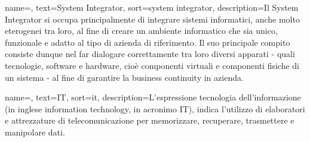 

{
    name=,
    text=System Integrator,
    sort=system integrator,
    description={Il System Integrator si occupa principalmente di integrare sistemi informatici, anche molto eterogenei tra loro, al fine di creare un ambiente informatico che sia unico, funzionale e adatto al tipo di azienda di riferimento. Il suo principale compito consiste dunque nel far dialogare correttamente tra loro diversi apparati - quali tecnologie, software e hardware, cioè componenti virtuali e componenti fisiche di un sistema - al fine di garantire la business continuity in azienda. }
}

{
    name=,
    text=IT,
    sort=it,
    description={L’espressione tecnologia dell’informazione (in inglese information technology, in acronimo IT), indica l’utilizzo di elaboratori e attrezzature di telecomunicazione per memorizzare, recuperare, trasmettere e manipolare dati.}
}
